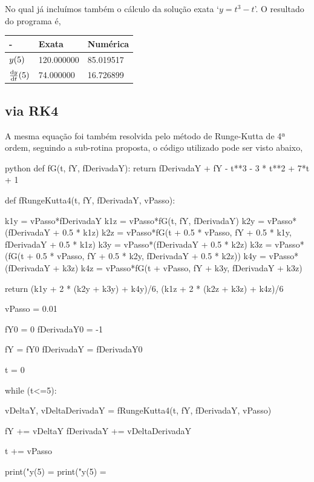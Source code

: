 \documentclass[twoside]{amsart}
\numberwithin{equation}{section}
\begin{document}
No qual já incluímos também o cálculo da solução exata `$y=t^3-t$'. O resultado do programa é,

\begin{table}[h]
    \begin{tabular}{lll}
    - &  Exata& Numérica \\\hline
    $y\qty(5)$  & 120.000000 & 85.019517 \\\hline
    $\dv{y}{t}\qty(5)$  &74.000000 & 16.726899
    \end{tabular}
\end{table}

\subsection{via RK4}

A mesma equação foi também resolvida pelo método de Runge-Kutta de 4ª ordem, seguindo a sub-rotina proposta, 
o código utilizado pode ser visto abaixo,

\begin{mintedbox}{python}
def fG(t, fY, fDerivadaY):
    return fDerivadaY + fY - t**3 - 3 * t**2 + 7*t + 1

def fRungeKutta4(t, fY, fDerivadaY, vPasso):

    k1y = vPasso*fDerivadaY
    k1z = vPasso*fG(t, fY, fDerivadaY)
    k2y = vPasso*(fDerivadaY + 0.5 * k1z)
    k2z = vPasso*fG(t + 0.5 * vPasso, fY + 0.5 * k1y, fDerivadaY + 0.5 * k1z)
    k3y = vPasso*(fDerivadaY + 0.5 * k2z)
    k3z = vPasso*(fG(t + 0.5 * vPasso, fY + 0.5 * k2y, fDerivadaY + 0.5 * k2z))
    k4y = vPasso*(fDerivadaY + k3z)
    k4z = vPasso*fG(t + vPasso, fY + k3y, fDerivadaY + k3z)

    return (k1y + 2 * (k2y + k3y) + k4y)/6, (k1z + 2 * (k2z + k3z) + k4z)/6

vPasso = 0.01

fY0 = 0
fDerivadaY0 = -1

fY = fY0
fDerivadaY = fDerivadaY0

t = 0

while (t<=5):

    vDeltaY, vDeltaDerivadaY = fRungeKutta4(t, fY, fDerivadaY, vPasso)

    fY += vDeltaY
    fDerivadaY += vDeltaDerivadaY
    
    t += vPasso

print("y(5) = %
print("y(5) = %
\end{mintedbox}
\end{document}
